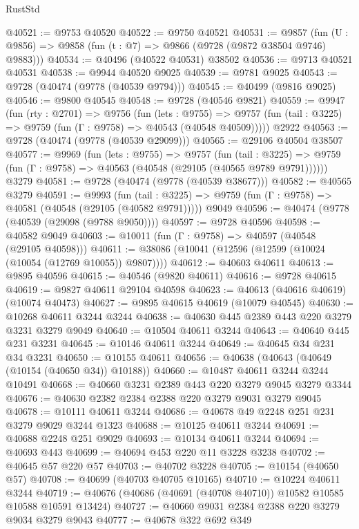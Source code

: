 \begin{lexlean}{RustStd}
\begin{coremodule}
@40521 := @9753 @40520
@40522 := @9750 @40521
@40531 := @9857
    (fun (U : @9856) => @9858 (fun (t : @7) => @9866 (@9728 (@9872 @38504 @9746) @9883)))
@40534 := @40496 (@40522 @40531) @38502
@40536 := @9713 @40521 @40531
@40538 := @9944 @40520 @9025
@40539 := @9781 @9025
@40543 := @9728 (@40474 (@9778 (@40539 @9794)))
@40545 := @40499 (@9816 @9025)
@40546 := @9800 @40545
@40548 := @9728 (@40546 @9821)
@40559 := @9947
    (fun (rty : @2701) =>
    @9756
      (fun (lets : @9755) =>
      @9757 (fun (tail : @3225) => @9759 (fun (Γ : @9758) => @40543 (@40548 @40509)))))
    @2922
@40563 := @9728 (@40474 (@9778 (@40539 @29099)))
@40565 := @29106 @40504 @38507
@40577 := @9969
    (fun (lets : @9755) =>
    @9757
      (fun (tail : @3225) =>
      @9759 (fun (Γ : @9758) => @40563 (@40548 (@29105 (@40565 @9789 @9791))))))
    @3279
@40581 := @9728 (@40474 (@9778 (@40539 @38677)))
@40582 := @40565 @3279
@40591 := @9993
    (fun (tail : @3225) => @9759 (fun (Γ : @9758) => @40581 (@40548 (@29105 (@40582 @9791)))))
    @9049
@40596 := @40474 (@9778 (@40539 (@29098 (@9788 @9050))))
@40597 := @9728 @40596
@40598 := @40582 @9049
@40603 := @10011 (fun (Γ : @9758) => @40597 (@40548 (@29105 @40598)))
@40611 := @38086 (@10041 (@12596 (@12599 (@10024 (@10054 (@12769 @10055)) @9807))))
@40612 := @40603 @40611
@40613 := @9895 @40596
@40615 := @40546 (@9820 @40611)
@40616 := @9728 @40615
@40619 := @9827 @40611 @29104 @40598
@40623 := @40613 (@40616 @40619) (@10074 @40473)
@40627 := @9895 @40615 @40619 (@10079 @40545)
@40630 := @10268 @40611 @3244 @3244
@40638 := @40630 @445 @2389 @443 @220 @3279 @3231 @3279 @9049
@40640 := @10504 @40611 @3244
@40643 := @40640 @445 @231 @3231
@40645 := @10146 @40611 @3244
@40649 := @40645 @34 @231 @34 @3231
@40650 := @10155 @40611
@40656 := @40638 (@40643 (@40649 (@10154 (@40650 @34)) @10188))
@40660 := @10487 @40611 @3244 @3244 @10491
@40668 := @40660 @3231 @2389 @443 @220 @3279 @9045 @3279 @3344
@40676 := @40630 @2382 @2384 @2388 @220 @3279 @9031 @3279 @9045
@40678 := @10111 @40611 @3244
@40686 := @40678 @49 @2248 @251 @231 @3279 @9029 @3244 @1323
@40688 := @10125 @40611 @3244
@40691 := @40688 @2248 @251 @9029
@40693 := @10134 @40611 @3244
@40694 := @40693 @443
@40699 := @40694 @453 @220 @11 @3228 @3238
@40702 := @40645 @57 @220 @57
@40703 := @40702 @3228
@40705 := @10154 (@40650 @57)
@40708 := @40699 (@40703 @40705 @10165)
@40710 := @10224 @40611 @3244
@40719 := @40676 (@40686 (@40691 (@40708 @40710)) @10582 @10585 @10588 @10591 @13424)
@40727 := @40660 @9031 @2384 @2388 @220 @3279 @9034 @3279 @9043
@40777 := @40678
    @322
    @692
    @349

\end{coremodule}
\end{lexlean}
